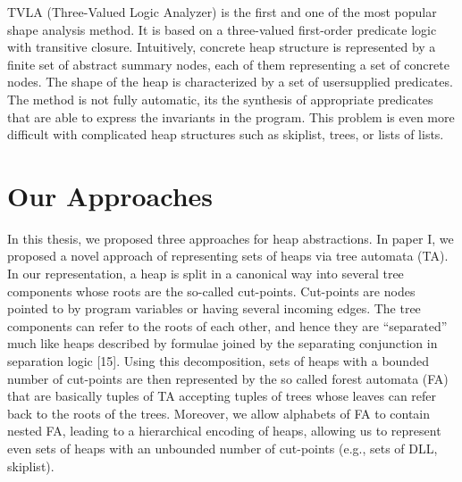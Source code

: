 TVLA (Three-Valued Logic Analyzer) \cite{SagivRW02} is the first and one of the most popular shape analysis
method. It is based on a three-valued first-order predicate logic with transitive closure. Intuitively,
concrete heap structure is represented by a finite set of abstract summary nodes, each of them
representing a set of concrete nodes. The shape of the heap is characterized by a set of usersupplied
predicates. The method is not fully automatic, its the synthesis of appropriate predicates
that are able to express the invariants in the program. This problem is even more difficult with
complicated heap structures such as skiplist, trees, or lists of lists.  
  
\section*{Our Approaches}
In this thesis, we proposed three approaches for heap abstractions. In paper I, we proposed a novel approach of representing sets of heaps via tree automata (TA). In our representation, a heap is split in a canonical way into several tree components whose roots are the so-called cut-points. Cut-points are nodes pointed to by program variables or having several incoming edges. The tree components can refer to the roots of each other, and hence they are “separated” much like heaps described by formulae joined by the separating conjunction in separation logic [15]. Using this decomposition, sets of heaps with a bounded number of cut-points are then represented by the so called forest automata (FA) that are basically tuples of TA accepting tuples of trees whose leaves can refer back to the roots of the trees. Moreover, we allow alphabets of FA to contain nested FA, leading to a hierarchical encoding of heaps, allowing us to represent even sets of heaps with an unbounded number of cut-points (e.g., sets of DLL, skiplist). 
